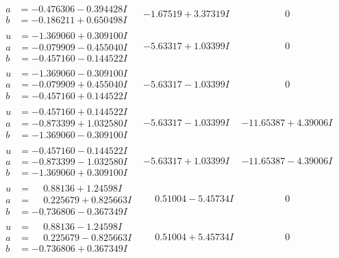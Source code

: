 \documentclass[1p]{elsarticle_modified}
\theoremstyle{definition}
\begin{document}
$$\begin{array}{c|c|c}
\begin{aligned}
a &= -0.476306 - 0.394428 I \\
b &= -0.186211 + 0.650498 I\end{aligned}
 & -1.67519 + 3.37319 I & \phantom{-0.000000 } 0 \\ \hline\begin{aligned}
u &= -1.369060 + 0.309100 I \\
a &= -0.079909 - 0.455040 I \\
b &= -0.457160 - 0.144522 I\end{aligned}
 & -5.63317 + 1.03399 I & \phantom{-0.000000 } 0 \\ \hline\begin{aligned}
u &= -1.369060 - 0.309100 I \\
a &= -0.079909 + 0.455040 I \\
b &= -0.457160 + 0.144522 I\end{aligned}
 & -5.63317 - 1.03399 I & \phantom{-0.000000 } 0 \\ \hline\begin{aligned}
u &= -0.457160 + 0.144522 I \\
a &= -0.873399 + 1.032580 I \\
b &= -1.369060 - 0.309100 I\end{aligned}
 & -5.63317 - 1.03399 I & -11.65387 + 4.39006 I \\ \hline\begin{aligned}
u &= -0.457160 - 0.144522 I \\
a &= -0.873399 - 1.032580 I \\
b &= -1.369060 + 0.309100 I\end{aligned}
 & -5.63317 + 1.03399 I & -11.65387 - 4.39006 I \\ \hline\begin{aligned}
u &= \phantom{-}0.88136 + 1.24598 I \\
a &= \phantom{-}0.225679 + 0.825663 I \\
b &= -0.736806 - 0.367349 I\end{aligned}
 & \phantom{-}0.51004 - 5.45734 I & \phantom{-0.000000 } 0 \\ \hline\begin{aligned}
u &= \phantom{-}0.88136 - 1.24598 I \\
a &= \phantom{-}0.225679 - 0.825663 I \\
b &= -0.736806 + 0.367349 I\end{aligned}
 & \phantom{-}0.51004 + 5.45734 I & \phantom{-0.000000 } 0 \\ \hline\begin{aligned}

\end{aligned}
\end{array}$$
\end{document}
